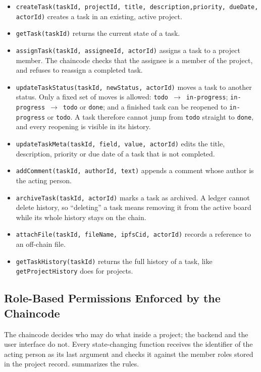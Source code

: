 \begin{itemize}
    \item \texttt{createTask(taskId, projectId, title, description,}\newline\texttt{\phantom{createTask(}priority, dueDate, actorId)} creates a task in an existing, active project.
    \item \texttt{getTask(taskId)} returns the current state of a task.
    \item \texttt{assignTask(taskId, assigneeId, actorId)} assigns a task to a project member. The chaincode checks that the assignee is a member of the project, and refuses to reassign a completed task.
    \item \texttt{updateTaskStatus(taskId, newStatus, actorId)} moves a task to another status. Only a fixed set of moves is allowed: \texttt{todo}~$\rightarrow$~\texttt{in-progress}; \texttt{in-progress}~$\rightarrow$~\texttt{todo} or \texttt{done}; and a finished task can be reopened to \texttt{in-progress} or \texttt{todo}. A task therefore cannot jump from \texttt{todo} straight to \texttt{done}, and every reopening is visible in its history.
    \item \texttt{updateTaskMeta(taskId, field, value, actorId)} edits the title, description, priority or due date of a task that is not completed.
    \item \texttt{addComment(taskId, authorId, text)} appends a comment whose author is the acting person.
    \item \texttt{archiveTask(taskId, actorId)} marks a task as archived. A ledger cannot delete history, so ``deleting'' a task means removing it from the active board while its whole history stays on the chain.
    \item \texttt{attachFile(taskId, fileName, ipfsCid, actorId)} records a reference to an off-chain file.
    \item \texttt{getTaskHistory(taskId)} returns the full history of a task, like \texttt{getProjectHistory} does for projects.
\end{itemize}

\subsection{Role-Based Permissions Enforced by the Chaincode}
\label{sec:permissions}

The chaincode decides who may do what inside a project; the backend and the user interface do not. Every state-changing function receives the identifier of the acting person as its last argument and checks it against the member roles stored in the project record.  summarizes the rules.

